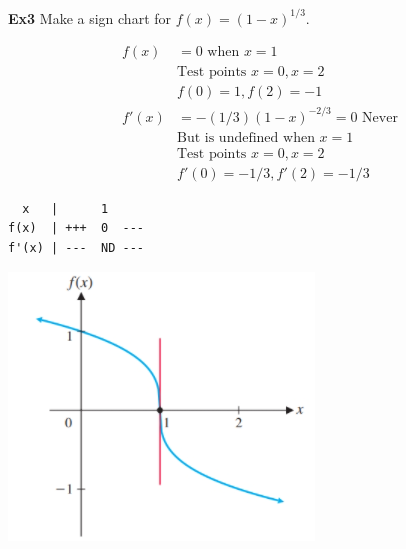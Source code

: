 \documentclass[14pt]{extarticle}
\begin{document}
\textbf{Ex3}
Make a sign chart for $f(x) = (1-x)^{1/3}$.	
\begin{multicols}{2}
	\begin{align*}
		f(x) &= 0 \text{ when } x=1 \\
		& \text{Test points } x = 0, x=2 \\
		&f(0)= 1, f(2) = -1 \\
		f'(x) &= -(1/3)(1-x)^{-2/3} = 0 \text{ Never}\\
		 &\text{But is undefined when } x=1 \\
		& \text{Test points } x =0, x=2 \\
		&f'(0)= -1/3, f'(2) = -1/3
	\end{align*}
\begin{verbatim}
  x   |      1
f(x)  | +++  0  ---
f'(x) | ---  ND ---
\end{verbatim}
	\vfill\null
	\columnbreak 
	\includegraphics[width=1\linewidth]{11-1-a7}
\end{multicols}
\end{document}
